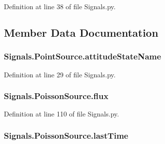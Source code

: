 Definition at line 38 of file Signals.\+py.



\subsection{Member Data Documentation}
\subsubsection[{\texorpdfstring{attitude\+State\+Name}{attitudeStateName}}]{\setlength{\rightskip}{0pt plus 5cm}Signals.\+Point\+Source.\+attitude\+State\+Name\hspace{0.3cm}{\ttfamily [inherited]}}\hypertarget{classSignals_1_1PointSource_a151f2600c3623d1ca49fb51feb8a1178}{}\label{classSignals_1_1PointSource_a151f2600c3623d1ca49fb51feb8a1178}


Definition at line 29 of file Signals.\+py.

\subsubsection[{\texorpdfstring{flux}{flux}}]{\setlength{\rightskip}{0pt plus 5cm}Signals.\+Poisson\+Source.\+flux\hspace{0.3cm}{\ttfamily [inherited]}}\hypertarget{classSignals_1_1PoissonSource_a26e7bf25b1d9195bfded2a3ad6790bce}{}\label{classSignals_1_1PoissonSource_a26e7bf25b1d9195bfded2a3ad6790bce}


Definition at line 110 of file Signals.\+py.

\subsubsection[{\texorpdfstring{last\+Time}{lastTime}}]{\setlength{\rightskip}{0pt plus 5cm}Signals.\+Poisson\+Source.\+last\+Time\hspace{0.3cm}{\ttfamily [inherited]}}\hypertarget{classSignals_1_1PoissonSource_a66b0f3fb48cc130b6b07d7427092a522}{}\label{classSignals_1_1PoissonSource_a66b0f3fb48cc130b6b07d7427092a522}


